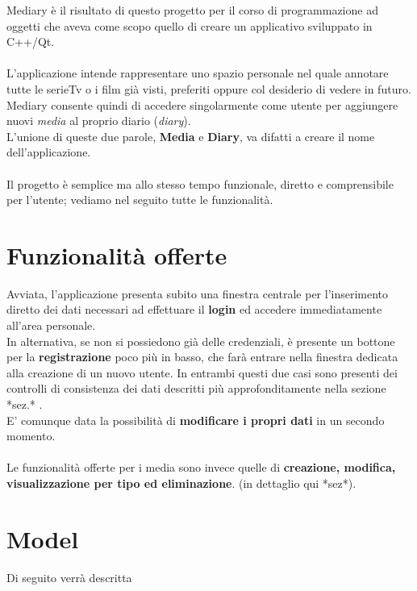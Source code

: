 \documentclass[10pt,a4paper,openany]{article}
\begin{document}
Mediary è il risultato di questo progetto per il corso di programmazione ad oggetti che aveva come scopo quello di creare un applicativo sviluppato in C++/Qt.\\\\
L'applicazione intende rappresentare uno spazio personale nel quale annotare tutte le serieTv o i film già visti, preferiti oppure col desiderio di vedere in futuro.\\
Mediary consente quindi di accedere singolarmente come utente per aggiungere nuovi \textit{media} al proprio diario (\textit{diary}).\\
L'unione di queste due parole, \textbf{Media} e \textbf{Diary}, va difatti a creare il nome dell'applicazione.\\\\
Il progetto è semplice ma allo stesso tempo funzionale, diretto e comprensibile per l'utente; vediamo nel seguito tutte le funzionalità.


\section{Funzionalità offerte}

Avviata, l'applicazione presenta subito una finestra centrale per l'inserimento diretto dei dati necessari ad effettuare il \textbf{login} ed accedere  immediatamente all'area personale.\\
In alternativa, se non si possiedono già delle credenziali, è presente un bottone per la \textbf{registrazione} poco più in basso, che farà entrare nella finestra dedicata alla creazione di un nuovo utente.
In entrambi questi due casi sono presenti dei controlli di consistenza dei dati descritti più approfonditamente nella sezione *sez.* .\\
E' comunque data la possibilità di \textbf{modificare i propri dati} in un secondo momento.\\\\
Le funzionalità offerte per i media sono invece quelle di \textbf{creazione, modifica, visualizzazione per tipo ed eliminazione}. (in dettaglio qui *sez*).

\newpage

\section{Model}

Di seguito verrà descritta




\newpage
\end{document}
